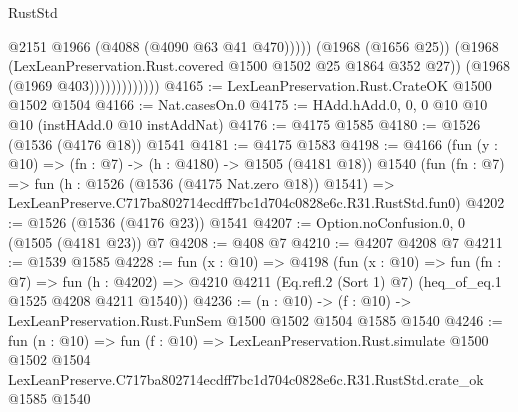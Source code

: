 \begin{lexlean}{RustStd}
\begin{coremodule}
                                @2151
                                @1966
                                (@4088 (@4090 @63 @41 @470)))))
                          (@1968 (@1656 @25))
                          (@1968 (LexLeanPreservation.Rust.covered @1500 @1502 @25 @1864 @352 @27))
                          (@1968 (@1969 @403)))))))))))))
@4165 := LexLeanPreservation.Rust.CrateOK @1500 @1502 @1504
@4166 := Nat.casesOn.{0}
@4175 := HAdd.hAdd.{0, 0, 0} @10 @10 @10 (instHAdd.{0} @10 instAddNat)
@4176 := @4175 @1585
@4180 := @1526 (@1536 (@4176 @18)) @1541
@4181 := @4175 @1583
@4198 := @4166
    (fun (y : @10) => (fn : @7) -> (h : @4180) -> @1505 (@4181 @18))
    @1540
    (fun (fn : @7) =>
    fun (h : @1526 (@1536 (@4175 Nat.zero @18)) @1541) =>
    LexLeanPreserve.C717ba802714ecdff7bc1d704c0828e6c.R31.RustStd.fun0)
@4202 := @1526 (@1536 (@4176 @23)) @1541
@4207 := Option.noConfusion.{0, 0} (@1505 (@4181 @23)) @7
@4208 := @408 @7
@4210 := @4207 @4208 @7
@4211 := @1539 @1585
@4228 := fun (x : @10) =>
  @4198
    (fun (x : @10) =>
    fun (fn : @7) =>
    fun (h : @4202) =>
    @4210 @4211 (Eq.refl.{2} (Sort 1) @7) (heq_of_eq.{1} @1525 @4208 @4211 @1540))
@4236 := (n : @10) -> (f : @10) -> LexLeanPreservation.Rust.FunSem @1500 @1502 @1504 @1585 @1540
@4246 := fun (n : @10) =>
  fun (f : @10) =>
  LexLeanPreservation.Rust.simulate
    @1500
    @1502
    @1504
    LexLeanPreserve.C717ba802714ecdff7bc1d704c0828e6c.R31.RustStd.crate_ok
    @1585
    @1540
\end{coremodule}
\end{lexlean}
